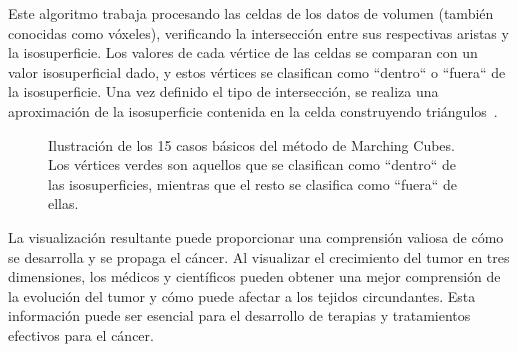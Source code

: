 Este algoritmo trabaja procesando las celdas de los datos de volumen (también conocidas como vóxeles), verificando la intersección entre sus respectivas aristas y la isosuperficie. Los valores de cada vértice de las celdas se comparan con un valor isosuperficial dado, y estos vértices se clasifican como ``dentro``  o ``fuera`` de la isosuperficie. Una vez definido el tipo de intersección, se realiza una aproximación de la isosuperficie contenida en la celda construyendo triángulos~\cite{cirne2013}.

\begin{figure}[!ht]
	\begin{center}
	\end{center}\vspace*{-0.6cm}
	\caption[Ilustración de Marching Cubes]{Ilustración de los 15 casos básicos del método de Marching Cubes. Los vértices verdes son aquellos que se clasifican como ``dentro`` de las isosuperficies, mientras que el resto se clasifica como ``fuera`` de ellas.}
	\label{fig-marching-cubes1}
	\end{figure}

La visualización resultante puede proporcionar una comprensión valiosa de cómo se desarrolla y se propaga el cáncer. Al visualizar el crecimiento del tumor en tres dimensiones, los médicos y científicos pueden obtener una mejor comprensión de la evolución del tumor y cómo puede afectar a los tejidos circundantes. Esta información puede ser esencial para el desarrollo de terapias y tratamientos efectivos para el cáncer.

